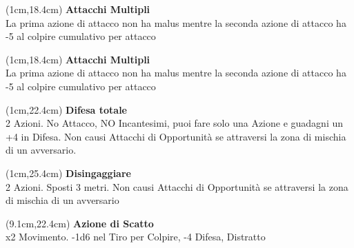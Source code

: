 \documentclass[a4paper,12 pt,openany]{book}
\begin{document}
\begin{textblock*}{4cm}(1cm,18.4cm) %
	\textbf{Attacchi Multipli}\\
La prima azione di attacco non ha malus mentre la seconda azione di attacco ha -5 al colpire cumulativo per attacco
\end{textblock*}


\begin{textblock*}{4cm}(1cm,18.4cm) %
	\textbf{Attacchi Multipli}\\
	La prima azione di attacco non ha malus mentre la seconda azione di attacco ha -5 al colpire cumulativo per attacco
\end{textblock*}




\begin{textblock*}{8cm}(1cm,22.4cm) %
\textbf{Difesa totale}\\
2 Azioni. No Attacco, NO Incantesimi, puoi fare solo una Azione e guadagni un +4 in Difesa. Non causi Attacchi di Opportunità se attraversi la zona di mischia di un avversario.
\end{textblock*}

\begin{textblock*}{8cm}(1cm,25.4cm) %
\textbf{Disingaggiare}\\
2 Azioni. Sposti 3 metri. Non causi Attacchi di Opportunità se attraversi la zona di mischia di un avversario
\end{textblock*}



\begin{textblock*}{6.7cm}(9.1cm,22.4cm) %
\textbf{Azione di Scatto}\\
x2 Movimento. -1d6 nel Tiro per Colpire, -4 Difesa, Distratto
\end{textblock*}
\end{document}
